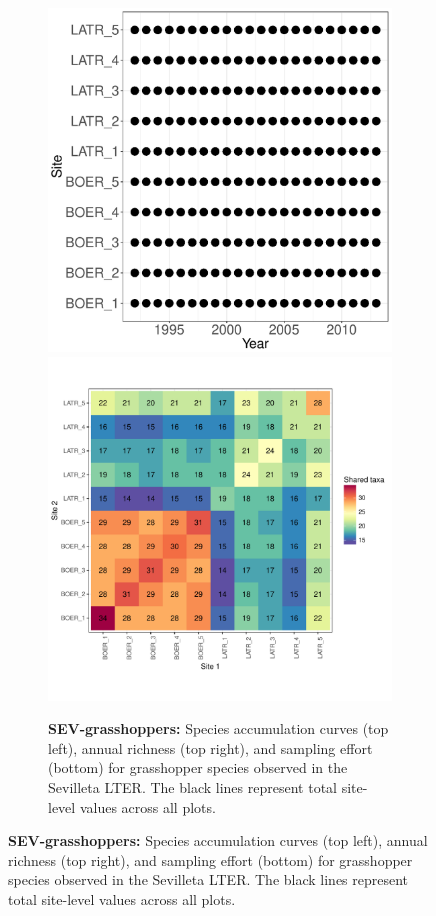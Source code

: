 \documentclass[11pt, oneside]{article}
\begin{document}
\begin{figure}[h!]
\begin{figure}[h!]
\includegraphics[scale = 0.4]{sev-grasshopper-compagnoni_spatiotemporal_sampling_effort.pdf}
\includegraphics[scale = 0.4]{sev-grasshopper-compagnoni_spp_shared.pdf}
\caption{{\bf SEV-grasshoppers:} Species accumulation curves (top left),  annual richness (top right), and sampling effort (bottom)  for grasshopper species observed in the Sevilleta LTER. The black lines represent total site-level values across all plots.}
\label{sev-grasshoppers}
\end{figure}



\end{figure}
\end{document}
